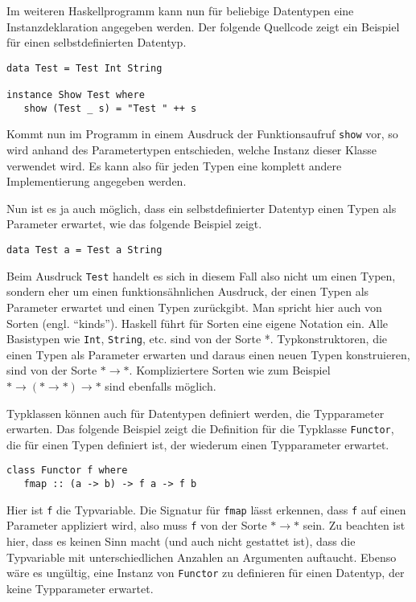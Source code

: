 Im weiteren Haskellprogramm kann nun für beliebige Datentypen eine Instanzdeklaration angegeben werden. Der folgende
Quellcode zeigt ein Beispiel für einen selbstdefinierten Datentyp.

\begin{verbatim}
data Test = Test Int String

instance Show Test where
   show (Test _ s) = "Test " ++ s
\end{verbatim}

Kommt nun im Programm in einem Ausdruck der Funktionsaufruf \texttt{show} vor, so wird anhand des Parametertypen
entschieden, welche Instanz dieser Klasse verwendet wird. Es kann also für jeden Typen eine komplett andere Implementierung
angegeben werden.

Nun ist es ja auch möglich, dass ein selbstdefinierter Datentyp einen Typen als Parameter erwartet, wie das folgende Beispiel
zeigt.

\begin{verbatim}
data Test a = Test a String
\end{verbatim}

Beim Ausdruck \texttt{Test} handelt es sich in diesem Fall also nicht um einen Typen, sondern eher um einen funktionsähnlichen Ausdruck, der
einen Typen als Parameter erwartet und einen Typen zurückgibt. Man spricht hier auch von Sorten (engl. ``kinds''). Haskell
führt für Sorten eine eigene Notation ein. Alle Basistypen wie \texttt{Int}, \texttt{String}, etc. sind von der Sorte *.
Typkonstruktoren, die einen Typen als Parameter erwarten und daraus einen neuen Typen konstruieren, sind von der Sorte
$* \rightarrow *$.
Kompliziertere Sorten wie zum Beispiel $* \rightarrow (* \rightarrow *) \rightarrow *$ sind ebenfalls möglich.

Typklassen können auch für Datentypen definiert werden, die Typparameter erwarten. Das folgende Beispiel zeigt die
Definition für die Typklasse \texttt{Functor}, die für einen Typen definiert ist, der wiederum einen Typparameter erwartet.

\begin{verbatim}
class Functor f where
   fmap :: (a -> b) -> f a -> f b
\end{verbatim}

Hier ist \texttt{f} die Typvariable. Die Signatur für \texttt{fmap} lässt erkennen, dass \texttt{f} auf einen Parameter appliziert
wird, also muss \texttt{f} von der Sorte $* \rightarrow *$ sein. Zu beachten ist hier, dass es keinen Sinn macht (und auch nicht
gestattet ist), dass die Typvariable mit unterschiedlichen Anzahlen an Argumenten auftaucht. Ebenso wäre es ungültig,
eine Instanz von \texttt{Functor} zu definieren für einen Datentyp, der keine Typparameter erwartet.

